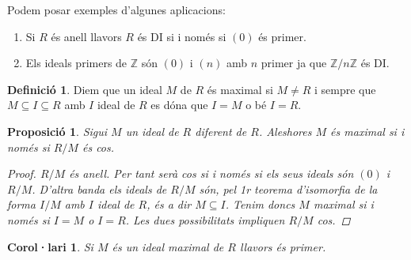 \documentclass[a4paper,11pt]{report}
\newcommand{\zn}{\mathbb{Z}/n\mathbb{Z}}
\theoremstyle{theorem}
\newtheorem{proposicio}{\normalfont \sffamily\bfseries Proposició}[section]
\newtheorem{col}{\normalfont \sffamily\bfseries Corol·lari}[section]
\theoremstyle{definition}
\newtheorem{definicio}{\normalfont\sffamily\bfseries Definició}[section]
\begin{document}
Podem posar exemples d'algunes aplicacions:\begin{enumerate}
	\item Si $R$ és anell llavors $R$ és DI si i només si $(0)$ és primer.
	\item Els ideals primers de $\mathbb{Z}$ són $(0)$ i $(n)$ amb $n$ primer ja que $\zn$ és DI. 
	
\end{enumerate}
\begin{definicio}
	Diem que un ideal $M$ de $R$ és maximal si $M\neq R$ i sempre que $M\subseteq I\subseteq R$ amb $I$ ideal de $R$ es dóna que $I=M$ o bé $I=R$.
\end{definicio}
\begin{proposicio}
	Sigui $M$ un ideal de $R$ diferent de $R$. Aleshores $M$ és maximal si i només si $R/M$ és cos.
	\begin{proof}
		$R/M$ és anell. Per tant serà cos si i només si els seus ideals són $(0)$ i $R/M$. D'altra banda els ideals de $R/M$ són, pel 1r teorema d'isomorfia de la forma $I/M$ amb $I$ ideal de $R$, és a dir $M\subseteq I$. Tenim doncs $M$ maximal si i només si $I=M$ o $I=R$. Les dues possibilitats impliquen $R/M$ cos.
	\end{proof}
\end{proposicio}
\begin{col}
	Si $M$ és un ideal maximal de $R$ llavors és primer.
\end{col}
\end{document}
